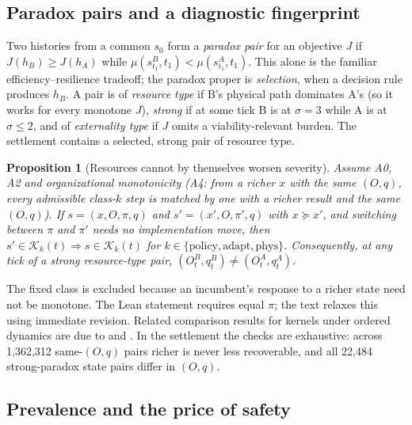 \documentclass[11pt]{article}
\theoremstyle{plain}
\newtheorem{proposition}[theorem]{Proposition}
\theoremstyle{definition}
\newcommand{\K}{\mathcal{K}}
\newcommand{\policy}{\mathrm{policy}}
\newcommand{\adapt}{\mathrm{adapt}}
\newcommand{\phys}{\mathrm{phys}}
\begin{document}
\subsection{Paradox pairs and a diagnostic fingerprint}

Two histories from a common $s_0$ form a \emph{paradox pair} for an objective $J$ if $J(h_B)\ge J(h_A)$ while $\mu(s^B_{t_1},t_1)<\mu(s^A_{t_1},t_1)$. This alone is the familiar efficiency--resilience tradeoff; the paradox proper is \emph{selection}, when a decision rule produces $h_B$. A pair is of \emph{resource type} if B's physical path dominates A's (so it works for every monotone $J$), \emph{strong} if at some tick B is at $\sigma=3$ while A is at $\sigma\le2$, and of \emph{externality type} if $J$ omits a viability-relevant burden. The settlement contains a selected, strong pair of resource type.

\begin{proposition}[Resources cannot by themselves worsen severity]\label{prop:resources}
Assume A0, A2 and organizational monotonicity (A4: from a richer $x$ with the same $(O,q)$, every admissible class-$k$ step is matched by one with a richer result and the same $(O,q)$). If $s=(x,O,\pi,q)$ and $s'=(x',O,\pi',q)$ with $x\succeq x'$, and switching between $\pi$ and $\pi'$ needs no implementation move, then $s'\in\K_k(t)\Rightarrow s\in\K_k(t)$ for $k\in\{\policy,\adapt,\phys\}$. Consequently, at any tick of a strong resource-type pair, $(O^B_t,q^B_t)\ne(O^A_t,q^A_t)$.
\end{proposition}

The fixed class is excluded because an incumbent's response to a richer state need not be monotone. The Lean statement requires equal $\pi$; the text relaxes this using immediate revision. Related comparison results for kernels under ordered dynamics are due to \citet{DeLaraEtAl2007} and \citet[Theorem~7]{DeLaraEtAl2020}. In the settlement the checks are exhaustive: across 1,362,312 same-$(O,q)$ pairs richer is never less recoverable, and all 22,484 strong-paradox state pairs differ in $(O,q)$.

\subsection{Prevalence and the price of safety}
\end{document}
